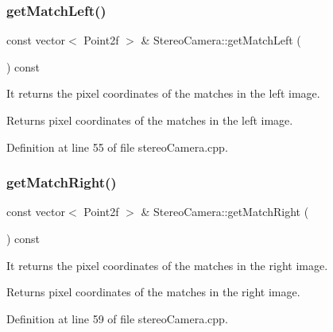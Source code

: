 \subsubsection{\texorpdfstring{getMatchLeft()}{getMatchLeft()}}
{\footnotesize\ttfamily const vector$<$ Point2f $>$ \& Stereo\+Camera\+::get\+Match\+Left (\begin{DoxyParamCaption}{ }\end{DoxyParamCaption}) const}



It returns the pixel coordinates of the matches in the left image. 

\begin{DoxyReturn}{Returns}
pixel coordinates of the matches in the left image. 
\end{DoxyReturn}


Definition at line 55 of file stereo\+Camera.\+cpp.


\begin{DoxyCode}{0}

\end{DoxyCode}
\mbox{\label{classStereoCamera_ac8b01bc577cc3de8e7e8bc246d5c50f0}} 
\subsubsection{\texorpdfstring{getMatchRight()}{getMatchRight()}}
{\footnotesize\ttfamily const vector$<$ Point2f $>$ \& Stereo\+Camera\+::get\+Match\+Right (\begin{DoxyParamCaption}{ }\end{DoxyParamCaption}) const}



It returns the pixel coordinates of the matches in the right image. 

\begin{DoxyReturn}{Returns}
pixel coordinates of the matches in the right image. 
\end{DoxyReturn}


Definition at line 59 of file stereo\+Camera.\+cpp.


\begin{DoxyCode}{0}

\end{DoxyCode}
\mbox{\label{classStereoCamera_a9f10e66261a0211e5d786abc3df8a70b}} 
